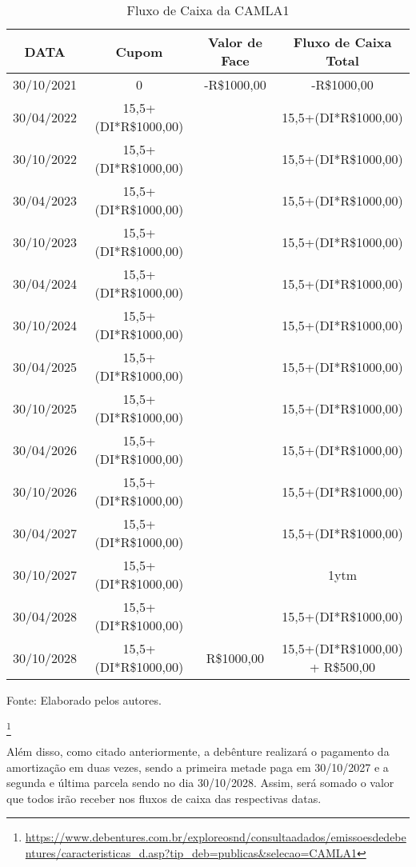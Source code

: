 \documentclass[11pt]{article}
\newcommand{\real}[1]{R\$#1}
\begin{document}
\begin{table}[H]
\centering
\caption{Fluxo de Caixa da CAMLA1 }
\begin{tabular}{|c|c|c|c|}
\hline
DATA & Cupom & Valor de Face & Fluxo de Caixa Total \\
\hline
30/10/2021 & 0 & -\real{1000,00} & -\real{1000,00} \\
30/04/2022 & 15,5+(DI*\real{1000,00}) & & 15,5+(DI*\real{1000,00}) \\
30/10/2022 & 15,5+(DI*\real{1000,00}) & & 15,5+(DI*\real{1000,00}) \\
30/04/2023 & 15,5+(DI*\real{1000,00}) & & 15,5+(DI*\real{1000,00}) \\
30/10/2023 & 15,5+(DI*\real{1000,00}) & & 15,5+(DI*\real{1000,00}) \\
30/04/2024 & 15,5+(DI*\real{1000,00}) & & 15,5+(DI*\real{1000,00}) \\
30/10/2024 & 15,5+(DI*\real{1000,00}) & & 15,5+(DI*\real{1000,00}) \\
30/04/2025 & 15,5+(DI*\real{1000,00}) & & 15,5+(DI*\real{1000,00}) \\
30/10/2025 & 15,5+(DI*\real{1000,00}) & & 15,5+(DI*\real{1000,00}) \\
30/04/2026 & 15,5+(DI*\real{1000,00}) & & 15,5+(DI*\real{1000,00}) \\
30/10/2026 & 15,5+(DI*\real{1000,00}) & & 15,5+(DI*\real{1000,00}) \\
30/04/2027 & 15,5+(DI*\real{1000,00}) & & 15,5+(DI*\real{1000,00}) \\
30/10/2027 & 15,5+(DI*\real{1000,00}) & & 1ytm \\
30/04/2028 & 15,5+(DI*\real{1000,00}) & & 15,5+(DI*\real{1000,00}) \\
30/10/2028 & 15,5+(DI*\real{1000,00}) & \real{1000,00} & 15,5+(DI*\real{1000,00}) + \real{500,00} \\
\hline
\end{tabular}
\label{tab:my_label}

\footnotesize{Fonte: Elaborado pelos autores.}
\end{table}
\footnote{\url{https://www.debentures.com.br/exploreosnd/consultaadados/emissoesdedebentures/caracteristicas_d.asp?tip_deb=publicas&selecao=CAMLA1}}

Além disso, como citado anteriormente, a debênture realizará o pagamento da amortização em duas vezes, sendo a primeira metade paga em 30/10/2027 e a segunda e última parcela sendo no dia 30/10/2028. Assim, será somado o valor que todos irão receber nos fluxos de caixa das respectivas datas. 
\end{document}
